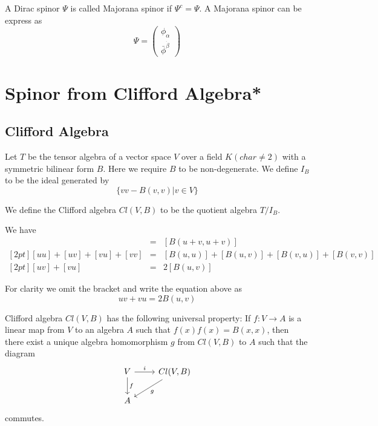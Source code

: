 \documentclass[12pt]{book}
\begin{document}
	A Dirac spinor $\Psi$ is called Majorana spinor if $\Psi^c=\Psi$. A Majorana spinor can be express as
	\begin{equation}
		\Psi=\begin{pmatrix}
			\phi_\alpha\\
			\bar\phi^{\dot\beta}
		\end{pmatrix}
	\end{equation}
		
	\section{Spinor from Clifford Algebra*}
	\subsection{Clifford Algebra}
	
	Let $T$ be the tensor algebra of a vector space $V$ over a field $K(char\neq 2)$ with a symmetric bilinear form $B$. Here we require $B$ to be non-degenerate. We define $I_B$ to be the ideal generated by
	\begin{equation}
		\{vv-B(v,v)|v\in V\}
	\end{equation}
	
	We define the Clifford algebra $Cl(V,B)$ to be the quotient algebra $T/I_B$.
	
	We have
	\begin{eqnarray}
		[(u+v)(u+v)]&=&[B(u+v,u+v)]\\
		[2pt][uu]+[uv]+[vu]+[vv]&=&[B(u,u)]+[B(u,v)]+[B(v,u)]+[B(v,v)]\\
		[2pt][uv]+[vu]&=&2[B(u,v)]
	\end{eqnarray}
	
	For clarity we omit the bracket and write the equation above as
	\begin{equation}
		uv+vu=2B(u,v)
	\end{equation}
	
	Clifford algebra $Cl(V,B)$ has the following universal property: If $f:V\rightarrow A$ is a linear map from $V$ to an algebra $A$ such that $f(x)f(x)=B(x,x)$, then there exist a unique algebra homomorphism $g$ from $Cl(V,B)$ to $A$ such that the diagram
	\begin{equation}
		\begin{tikzcd}
			V\arrow[r,"i"]\arrow[d,"f"]&Cl(V,B)\arrow[ld,"g"]\\
			A
		\end{tikzcd}
	\end{equation}
	commutes.
	
\end{document}
